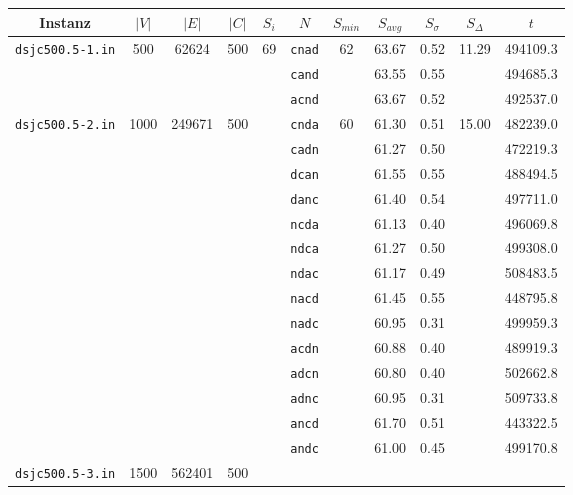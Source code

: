 \documentclass[paper=a4,fontsize=12pt]{scrartcl}
\begin{document}
\begin{table}[p]
\centering
\begin{tabular}{|c|ccc|c|c|ccc|c|c|}
\hline
Instanz & \multicolumn{1}{c}{$|V|$} & \multicolumn{1}{c}{$|E|$} & \multicolumn{1}{c|}{$|C|$} & \multicolumn{1}{c|}{$S_i$} & \multicolumn{1}{c|}{$N$} & $S_{min}$ & \multicolumn{1}{c}{$S_{avg}$} & \multicolumn{1}{c|}{$S_{\sigma}$} & \multicolumn{1}{c|}{$S_{\Delta}$} & \multicolumn{1}{c|}{$t$} \\
\hline\hline

\multirow{3}{*}{\texttt{dsjc500.5-1.in}} & \multirow{3}{*}{500} & \multirow{3}{*}{62624} & \multirow{3}{*}{500} & \multirow{32}{*}{69} &
      \texttt{cnad}	& \multirow{3}{*}{62}	& 63.67	& 0.52	& \multirow{3}{*}{11.29}	& 494109.3\\
&&&&& \texttt{cand}	&			& 63.55	& 0.55	&				& 494685.3\\
&&&&& \texttt{acnd}	&			& 63.67	& 0.52	&				& 492537.0\\
\cline{1-4}\cline{6-11}
\multirow{14}{*}{\texttt{dsjc500.5-2.in}} & \multirow{14}{*}{1000} & \multirow{14}{*}{249671} & \multirow{14}{*}{500} & &
      \texttt{cnda}	& \multirow{14}{*}{60}	& 61.30	& 0.51	& \multirow{14}{*}{15.00}	& 482239.0\\
&&&&& \texttt{cadn}	&			& 61.27	& 0.50	&				& 472219.3\\
&&&&& \texttt{dcan}	&			& 61.55	& 0.55	&				& 488494.5\\
&&&&& \texttt{danc}	&			& 61.40	& 0.54	&				& 497711.0\\
&&&&& \texttt{ncda}	&			& 61.13	& 0.40	&				& 496069.8\\
&&&&& \texttt{ndca}	&			& 61.27	& 0.50	&				& 499308.0\\
&&&&& \texttt{ndac}	&			& 61.17	& 0.49	&				& 508483.5\\
&&&&& \texttt{nacd}	&			& 61.45	& 0.55	&				& 448795.8\\
&&&&& \texttt{nadc}	&			& 60.95	& 0.31	&				& 499959.3\\
&&&&& \texttt{acdn}	&			& 60.88	& 0.40	&				& 489919.3\\
&&&&& \texttt{adcn}	&			& 60.80	& 0.40	&				& 502662.8\\
&&&&& \texttt{adnc}	&			& 60.95	& 0.31	&				& 509733.8\\
&&&&& \texttt{ancd}	&			& 61.70	& 0.51	&				& 443322.5\\
&&&&& \texttt{andc}	&			& 61.00	& 0.45	&				& 499170.8\\
\cline{1-4}\cline{6-11}
\multirow{14}{*}{\texttt{dsjc500.5-3.in}} & \multirow{14}{*}{1500} & \multirow{14}{*}{562401} & \multirow{14}{*}{500} & &

\end{tabular}
\end{table}
\end{document}
